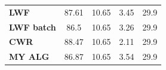 \documentclass[12pt]{report}
\begin{document}
\begin{table}[]
\begin{center}
\begin{tabular}{l|cccc}
\textbf{LWF}         & 87.61                                     & 10.65                                                                                                                & 3.45                                                                                                             & 29.9                                                                                                 \\ \cline{1-1}
\textbf{LWF batch}   & 86.5                                      & 10.65                                                                                                                & 3.26                                                                                                             & 29.9                                                                                                 \\ \cline{1-1}
\textbf{CWR}         & 88.47                                     & 10.65                                                                                                                & 2.11                                                                                                             & 29.9                                                                                                 \\ \cline{1-1}
\textbf{MY ALG}      & 86.87                                     & 10.65                                                                                                                & 3.54                                                                                                             & 29.9                                                                                                 \\ \cline{1-1}
\end{tabular}
\end{center}
\end{table}
%
\end{document}
